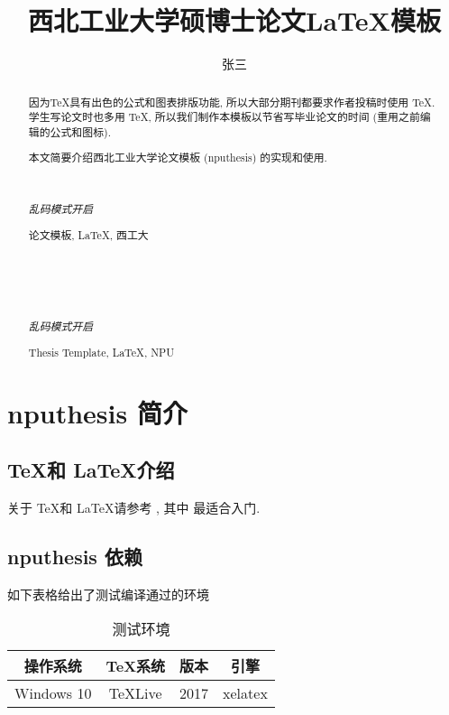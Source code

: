 \documentclass[twoside,UTF8,phd,multibib]{nputhesis}
\title[\LaTeX\ Template for Thesis of NPU]{西北工业大学硕博士论文\LaTeX 模板}
\author[San Zhang]{张三}
\theoremstyle{plain}
\begin{document}
\makecover  %
\frontmatter

\begin{abstract}  
    因为\TeX 具有出色的公式和图表排版功能, 所以大部分期刊都要求作者投稿时使用
    \TeX. 学生写论文时也多用 \TeX, 所以我们制作本模板以节省写毕业论文的时间 
    (重用之前编辑的公式和图标).

    本文简要介绍西北工业大学论文模板 (nputhesis) 的实现和使用.

    { %
        \noindent\hrulefill\\
        {\centerline {\it 乱码模式开启}}
        \noindent\hrulefill
    }
    \begin{keywords}
        论文模板, \LaTeX, 西工大 
    \end{keywords}
\end{abstract}

\begin{Abstract}

    { %
        \noindent\hrulefill\\
        {\centerline {\it 乱码模式开启}}
        \noindent\hrulefill
    }
    \begin{Keywords}
        Thesis Template, \LaTeX, NPU
    \end{Keywords}
\end{Abstract}

\tableofcontents 

\mainmatter  %
\chapter{nputhesis 简介}
\section{\TeX 和 \LaTeX 介绍}
关于 \TeX 和 \LaTeX 请参考 \cite{Knuth1986,Lamport1994,Liu2013}, 其中 \cite{Liu2013} 最适合入门.  

\section{nputhesis 依赖}
如下表格给出了测试编译通过的环境
\begin{table}[h]
  \caption{测试环境\cite{Liu2013}}
    \centering
    \begin{tabular}{cccc}
        \toprule
        操作系统    & \TeX 系统   & 版本  & 引擎\\
        \midrule
        Windows 10  & TeXLive     & 2017  & xelatex\\
        \bottomrule
    \end{tabular}
\end{table}
\end{document}

